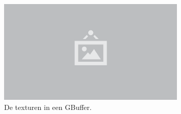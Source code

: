 \begin{figure}
  \centering
  \includegraphics[width=0.8\textwidth]{./img/raw/placeholder.png}
  \caption{De texturen in een GBuffer.}
  \label{fig:fds-gbuffer}
\end{figure}
